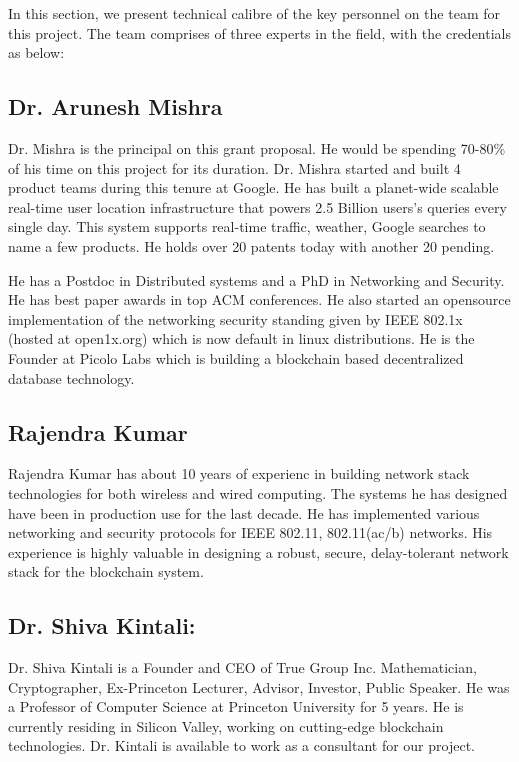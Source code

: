 In this section, we present technical calibre of the key personnel on the team for this project. The team comprises of
three experts in the field, with the credentials as below:

\subsection*{Dr. Arunesh Mishra}

Dr. Mishra is the principal on this grant proposal. He would be spending 70-80\% of his time on this project for its
duration. Dr. Mishra started and built 4 product teams during this tenure at Google. He has built a planet-wide scalable
real-time user location infrastructure that powers 2.5 Billion users's queries every single day. This system supports
real-time traffic, weather, Google searches to name a few products. He holds over 20 patents today with another 20
pending. 

He has a Postdoc in Distributed systems and a PhD in Networking and Security. He has best paper awards in top ACM
conferences. He also started an opensource implementation of the networking security standing given by IEEE 802.1x
(hosted at open1x.org) which is now default in linux distributions. He is the Founder at Picolo Labs which is building a
blockchain based decentralized database technology.

\subsection*{Rajendra Kumar}

Rajendra Kumar has about 10 years of experienc in building network stack technologies for both wireless and wired
computing. The systems he has designed have been in production use for the last decade. He has implemented various
networking and security protocols for IEEE 802.11, 802.11(ac/b) networks. His experience is highly valuable in designing
a robust, secure, delay-tolerant network stack for the blockchain system.

\subsection*{Dr. Shiva Kintali:} 
Dr. Shiva Kintali is a Founder and CEO of True Group Inc. Mathematician, Cryptographer, Ex-Princeton Lecturer, Advisor,
Investor, Public Speaker. He was a Professor of Computer Science at Princeton University for 5 years. He is currently
residing in Silicon Valley, working on cutting-edge blockchain technologies. Dr. Kintali is available to work as a
consultant for our project.

